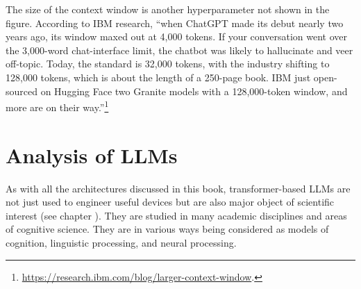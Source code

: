 The size of the context window is another hyperparameter not shown in the figure. According to IBM research, ``when ChatGPT made its debut nearly two years ago, its window maxed out at 4,000 tokens. If your conversation went over the 3,000-word chat-interface limit, the chatbot was likely to hallucinate and veer off-topic. Today, the standard is 32,000 tokens, with the industry shifting to 128,000 tokens, which is about the length of a 250-page book. IBM just open-sourced on Hugging Face two Granite models with a 128,000-token window, and more are on their way.''\footnote{\url{https://research.ibm.com/blog/larger-context-window}.}



%
%
% 
%
%
%
%

\section{Analysis of LLMs}\label{llm_analsis}

As with all the architectures discussed in this book, transformer-based LLMs are not just used to engineer useful devices but are also major object of scientific interest (see chapter ). They are studied in many academic disciplines and areas of cognitive science. They are in various ways being considered as models of cognition, linguistic processing, and neural processing. 

